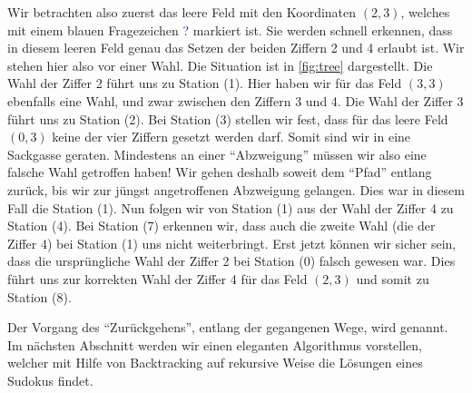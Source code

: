 Wir betrachten also zuerst das leere Feld mit den Koordinaten $(2,3)$, welches mit einem blauen Fragezeichen \textcolor{Blue}{?} markiert ist. Sie werden schnell erkennen, dass in diesem leeren Feld genau das Setzen der beiden Ziffern 2 und 4 erlaubt ist. Wir stehen hier also vor einer Wahl. Die Situation ist in \cref{fig:tree} dargestellt. Die Wahl der Ziffer 2 führt uns zu Station (1). Hier haben wir für das Feld $(3,3)$ ebenfalls eine Wahl, und zwar zwischen den Ziffern 3 und 4. Die Wahl der Ziffer 3 führt uns zu Station (2). Bei Station (3) stellen wir fest, dass für das leere Feld $(0,3)$ keine der vier Ziffern gesetzt werden darf. Somit sind wir in eine Sackgasse geraten. Mindestens an einer \enquote{Abzweigung} müssen wir also eine falsche Wahl getroffen haben! Wir gehen deshalb soweit dem \enquote{Pfad} entlang zurück, bis wir zur jüngst angetroffenen Abzweigung gelangen. Dies war in diesem Fall die Station (1). Nun folgen wir von Station (1) aus der Wahl der Ziffer 4 zu Station (4). Bei Station (7) erkennen wir, dass auch die zweite Wahl (die der Ziffer 4) bei Station (1) uns nicht weiterbringt. Erst jetzt können wir sicher sein, dass die ursprüngliche Wahl der Ziffer 2 bei Station (0) falsch gewesen war. Dies führt uns zur korrekten Wahl der Ziffer 4 für das Feld $(2,3)$ und somit zu Station (8).

Der Vorgang des \enquote{Zurückgehens}, entlang der gegangenen Wege, wird  genannt. Im nächsten Abschnitt werden wir einen eleganten Algorithmus vorstellen, welcher mit Hilfe von Backtracking auf rekursive Weise die Lösungen eines Sudokus findet.

